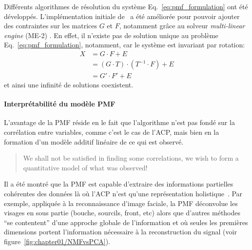 Différents algorithmes de résolution du système Eq.~\ref{eq:pmf_formulation} ont été développés.
L'implémentation initiale de~\cite{paateroLeast1997} a été améliorée pour pouvoir
ajouter des contraintes sur les matrices $G$ et $F$, notamment grâce au solveur
\textit{multi-linear engine} (ME-2) \autocite{paateroMultilinear1999}. En effet, il
n'existe pas de solution unique au problème Eq.~\ref{eq:pmf_formulation}, notamment, car le
système est invariant par rotation:
\begin{align}
    \label{eq:rotationalambiguity}
    X   &= G \cdot F + E \\
        &= (G \cdot T) \cdot (T^{-1} \cdot F) + E\\
        &= G' \cdot F' + E
\end{align}
et ainsi une infinité de solutions coexistent. 

\paragraph{Interprétabilité du modèle PMF}%
\label{par:interpretabilite_du_model_PMF}

L'avantage de la PMF réside en le fait que l'algorithme n'est pas fondé sur la
corrélation entre variables, comme c'est le cas de l'ACP, mais bien en la formation d'un
modèle additif linéaire de ce qui est observé.
\begin{quote}
    We shall not be satisfied in finding some correlations, we wish to form a quantitative
    model of what was observed! \autocite{paateroPositive1994}
\end{quote}

Il a été montré que la PMF est capable d'extraire des informations partielles cohérentes des
données là où l'ACP n'est qu'une représentation holistique~\autocite{leeLearning1999}. Par
exemple, appliquée à la reconnaissance d'image faciale, la PMF déconvolue les visages en
sous partie (bouche, sourcils, front, etc) alors que d'autres méthodes ``se contentent''
d'une approche globale de l'information et où seules les premières dimensions portent
l'information nécessaire à la reconstruction du signal (voir
figure~\ref{fig:chapter01/NMFvsPCA}).

